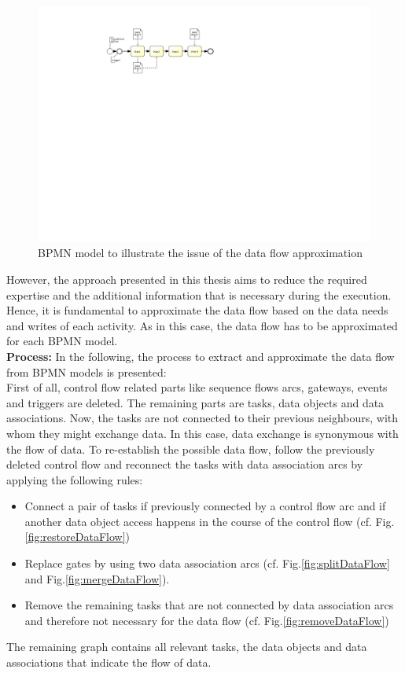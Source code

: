 \begin{figure}[h!]
	\centering
	\includegraphics[width=\textwidth, trim={3.5cm 15cm 12.5cm 2cm}]{img/ExtractDFDProblem.pdf}
	\caption{BPMN model to illustrate the issue of the data flow approximation}
	\label{fig:problemDataFlow}
\end{figure}

\noindent
However, the approach presented in this thesis aims to reduce the required expertise and the additional information that is necessary during the execution. 
Hence, it is fundamental to approximate the data flow based on the data needs and writes of each activity. As in this case, the data flow has to be approximated for each BPMN model. \\

\noindent
\textbf{Process:} In the following, the process to extract and approximate the data flow from BPMN models is presented: \\
First of all, control flow related parts like sequence flows arcs, gateways, events and triggers are deleted. The remaining parts are tasks, data objects and data associations. Now, the tasks are not connected to their previous neighbours, with whom they might exchange data. In this case, data exchange is synonymous with the flow of data.
To re-establish the possible data flow, follow the previously deleted control flow and reconnect the tasks with data association arcs by applying the following rules:

\begin{itemize}
	\item Connect a pair of tasks if previously connected by a control flow arc and 
	if another data object access happens in the course of the control flow (cf. Fig.\ref{fig:restoreDataFlow})
	\item Replace gates by using two data association arcs (cf. Fig.\ref{fig:splitDataFlow} and Fig.\ref{fig:mergeDataFlow}). 
	\item Remove the remaining tasks that are not connected by data association arcs and therefore not necessary for the data flow (cf. Fig.\ref{fig:removeDataFlow})
	
\end{itemize}
The remaining graph contains all relevant tasks, the data objects and data associations that indicate the flow of data.


